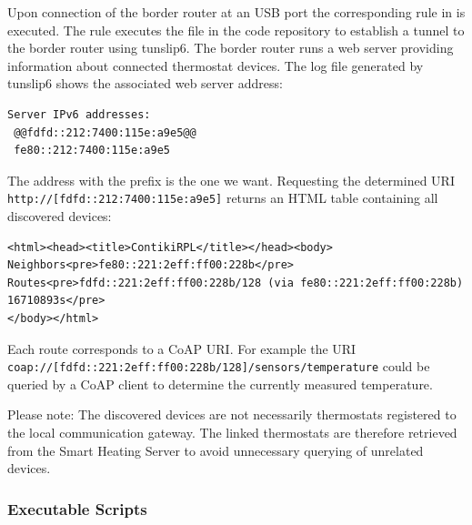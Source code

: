 Upon connection of the border router at an USB port the corresponding rule in  is executed.
The rule executes the file  in the code repository to establish a tunnel to the border router using tunslip6.
The border router runs a web server providing information about connected thermostat devices.
The log file  generated by tunslip6 shows the associated web server address:

\begin{lstlisting}[numbers=none, moredelim={[is][keywordstyle]{@@}{@@}}]
Server IPv6 addresses:
 @@fdfd::212:7400:115e:a9e5@@
 fe80::212:7400:115e:a9e5
\end{lstlisting}

The address with the prefix  is the one we want. Requesting the determined URI \nolinkurl{http://[fdfd::212:7400:115e:a9e5]} returns an HTML table containing all discovered devices:

\noindent
\begin{minipage}{\linewidth}
\begin{lstlisting}[numbers=none]
<html><head><title>ContikiRPL</title></head><body>
Neighbors<pre>fe80::221:2eff:ff00:228b</pre>
Routes<pre>fdfd::221:2eff:ff00:228b/128 (via fe80::221:2eff:ff00:228b) 16710893s</pre>
</body></html>
\end{lstlisting}
\end{minipage}

Each route corresponds to a CoAP URI. For example the URI \nolinkurl{coap://[fdfd::221:2eff:ff00:228b/128]/sensors/temperature} could be queried by a CoAP client to determine the currently measured temperature.

Please note: The discovered devices are not necessarily thermostats registered to the local communication gateway.
The linked thermostats are therefore retrieved from the Smart Heating Server to avoid unnecessary querying of unrelated devices.


\subsubsection{Executable Scripts}
\label{sec:local_infrastructure_implementation_scripts}

